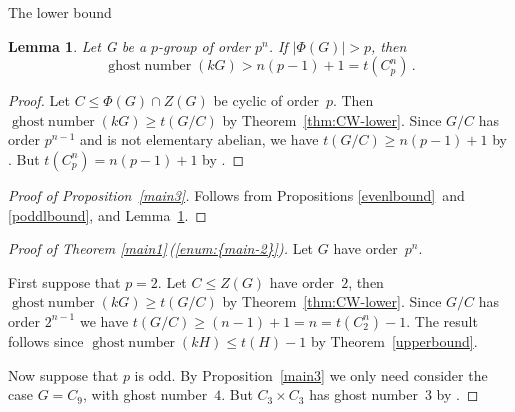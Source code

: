 \documentclass[12pt,reqno]{amsart}
\newtheorem{lem}[thm]{Lemma}
\theoremstyle{definition}
\theoremstyle{remark}
\begin{document}
\begin{section}{The lower bound}

\begin{lem}
\label{notelab}
Let G be a $p$-group of order $p^n$. If ${\left\vert{\Phi(G)}\right\vert} > p$, then
\[
{\operatorname{ghost\;number}}(kG) > n(p-1) + 1 = t(C_p^n) \, .
\]
\end{lem}

\begin{proof}
Let $C \leq \Phi(G) \cap Z(G)$ be cyclic of order~$p$. Then ${\operatorname{ghost\;number}}(kG) \geq t(G/C)$ by Theorem~\ref{thm:CW-lower}. Since $G/C$ has order $p^{n-1}$ and is not elementary abelian, we have $t(G/C) \geq n(p-1)+1$ by \cite[Thm 6]{Motose:Koshitani}\@.
But $t(C_p^n) = n(p-1)+1$ by \cite[Thm 1]{MotoseNinomiya:nilpotencyIndex}\@.
\end{proof}

\begin{proof}[Proof of Proposition~\ref{main3}]
Follows from Propositions \ref{evenlbound}~and \ref{poddlbound}, and Lemma~\ref{notelab}\@.
\end{proof}

\begin{proof}[Proof of Theorem \ref{main1}\,({\ref{enum:{main-2}}})]
Let $G$ have order~$p^n$.

First suppose that $p=2$. Let $C \leq Z(G)$ have order~$2$, then ${\operatorname{ghost\;number}}(kG) \geq t(G/C)$ by Theorem~\ref{thm:CW-lower}. Since $G/C$ has order $2^{n-1}$ we have $t(G/C) \geq (n-1)+1 = n = t(C_2^n) - 1$. The result follows since ${\operatorname{ghost\;number}}(kH) \leq t(H)-1$ by Theorem~\ref{upperbound}\@.

Now suppose that $p$ is odd.
By Proposition~\ref{main3} we only need consider the case $G = C_9$, with ghost number~$4$. But $C_3 \times C_3$ has ghost number~$3$ by \cite[Thm 1.1]{ChristensenWang:ghostNumbers}\@.
\end{proof}

\end{section}
\end{document}
